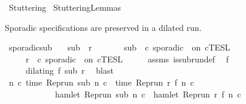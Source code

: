 %
\begin{isabellebody}%
%
%
\isadelimdocument
%
\endisadelimdocument
%
\isatagdocument
%
\isamarkuptrue%
%
\endisatagdocument
{\isafolddocument}%
%
\isadelimdocument
%
\endisadelimdocument
%
\isadelimtheory
%
\endisadelimtheory
%
\isatagtheory
{}\isamarkupfalse%
\ Stuttering\isanewline
{}\ StutteringLemmas\isanewline
\isanewline
{}%
\endisatagtheory
{\isafoldtheory}%
%
\isadelimtheory
%
\endisadelimtheory
%
\begin{isamarkuptext}%
Sporadic specifications are preserved in a dilated run.%
\end{isamarkuptext}\isamarkuptrue%
\isamarkupfalse%
\ sporadic{\isacharunderscore}sub{\isacharcolon}\isanewline
\ \ \ {\isacartoucheopen}sub\ {\isasymlless}\ r{\isacartoucheclose}\isanewline
\ \ \ \ \ \ \ {\isacartoucheopen}sub\ {\isasymin}\ {\isasymlbrakk}c\ sporadic\ {\isasymtau}\ on\ c{\isacharprime}{\isasymrbrakk}\isactrlsub T\isactrlsub E\isactrlsub S\isactrlsub L{\isacartoucheclose}\isanewline
\ \ \ \ \ {\isacartoucheopen}r\ {\isasymin}\ {\isasymlbrakk}c\ sporadic\ {\isasymtau}\ on\ c{\isacharprime}{\isasymrbrakk}\isactrlsub T\isactrlsub E\isactrlsub S\isactrlsub L{\isacartoucheclose}\isanewline
%
\isadelimproof
%
\endisadelimproof
%
\isatagproof
{}\isamarkupfalse%
\ {\isacharminus}\isanewline
\ \ \isamarkupfalse%
\ assms{\isacharparenleft}{}{\isacharparenright}\ is{\isacharunderscore}subrun{\isacharunderscore}def\ \isamarkupfalse%
\ f\isanewline
\ \ \ \ \ {\isacartoucheopen}dilating\ f\ sub\ r{\isacartoucheclose}\ \isamarkupfalse%
\ blast\isanewline
\ \ \isamarkupfalse%
\ {\isacartoucheopen}{\isasymforall}n\ c{\isachardot}\ time\ {\isacharparenleft}{\isacharparenleft}Rep{\isacharunderscore}run\ sub{\isacharparenright}\ n\ c{\isacharparenright}\ {\isacharequal}\ time\ {\isacharparenleft}{\isacharparenleft}Rep{\isacharunderscore}run\ r{\isacharparenright}\ {\isacharparenleft}f\ n{\isacharparenright}\ c{\isacharparenright}\isanewline
\ \ \ \ \ \ \ \ \ \ \ {\isasymand}\ hamlet\ {\isacharparenleft}{\isacharparenleft}Rep{\isacharunderscore}run\ sub{\isacharparenright}\ n\ c{\isacharparenright}\ {\isacharequal}\ hamlet\ {\isacharparenleft}{\isacharparenleft}Rep{\isacharunderscore}run\ r{\isacharparenright}\ {\isacharparenleft}f\ n{\isacharparenright}\ c{\isacharparenright}{\isacartoucheclose}\ \isamarkupfalse%

\end{isabellebody}
